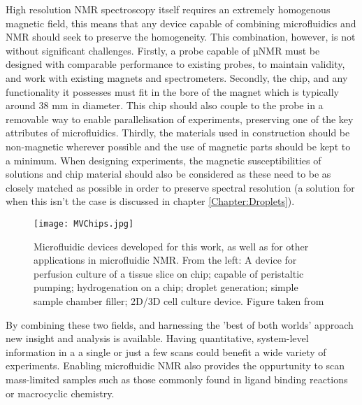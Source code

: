 High resolution NMR spectroscopy itself requires an extremely homogenous magnetic field, this means that
any device capable of combining microfluidics and NMR should seek to preserve the homogeneity. This combination,
however, is not without significant challenges. Firstly, a probe capable of µNMR must
be designed with comparable performance to existing probes, to maintain validity, and work with existing
magnets and spectrometers. Secondly, the chip, and any functionality it possesses must fit in the bore of
the magnet which is typically around 38 mm in diameter. This chip should also couple to the probe in a
removable way to enable parallelisation of experiments, preserving one of the key attributes of microfluidics.
Thirdly, the materials used in construction should be non-magnetic wherever possible and the use of magnetic
parts should be kept to a minimum. When designing experiments, the magnetic susceptibilities of solutions and
chip material should also be considered as these need to be as closely matched as possible in order to preserve
spectral resolution (a solution for when this isn’t the case is discussed in chapter \ref{Chapter:Droplets}).


\begin{figure}
  \begin{center}
  \texttt{[image: MVChips.jpg]}
  \end{center}
  \caption{Microfluidic devices developed for this work, as well as for other applications in microfluidic
  NMR. From the left: A device for perfusion culture of a tissue slice on chip; capable of peristaltic
  pumping; hydrogenation on a chip; droplet generation; simple sample chamber filler; 2D/3D cell culture
  device. Figure taken from \citep{RN164}}
  \label{fig:DifferentChips}
\end{figure}

By combining these two fields, and harnessing the 'best of both worlds' approach
new insight and analysis is available. Having quantitative, system-level information in a
a single or just a few scans could benefit a wide variety of experiments. Enabling microfluidic
NMR also provides the oppurtunity to scan mass-limited samples such as those commonly found in
ligand binding reactions\citep{Finch:2016gv} or macrocyclic chemistry\citep{RN81}.
